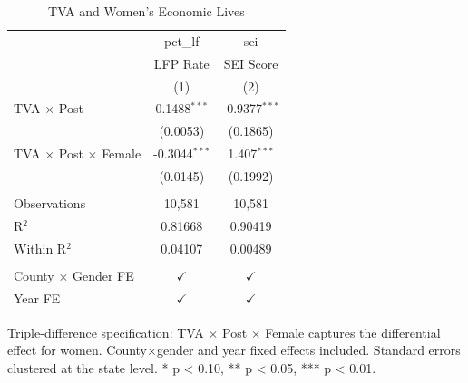 
\begin{table}[htbp]
   \caption{\label{tab:gender} TVA and Women's Economic Lives}
   \bigskip
   \centering
   \begin{tabular}{lcc}
      \toprule
                                    & pct\_lf         & sei\\  
                                    & LFP Rate        & SEI Score \\   
                                    & (1)             & (2)\\  
      \midrule 
      TVA $\times$ Post                    & 0.1488$^{***}$  & -0.9377$^{***}$\\   
                                    & (0.0053)        & (0.1865)\\   
      TVA $\times$ Post $\times$ Female             & -0.3044$^{***}$ & 1.407$^{***}$\\   
                                    & (0.0145)        & (0.1992)\\   
       \\
      Observations                  & 10,581          & 10,581\\  
      R$^2$                         & 0.81668         & 0.90419\\  
      Within R$^2$                  & 0.04107         & 0.00489\\  
       \\
      County $\times$ Gender FE  & $\checkmark$    & $\checkmark$\\   
      Year FE            & $\checkmark$    & $\checkmark$\\   
      \bottomrule
   \end{tabular}
   
   \par \raggedright 
   Triple-difference specification: TVA $\times$ Post $\times$ Female captures the differential effect for women. County$\times$gender and year fixed effects included. Standard errors clustered at the state level. * p < 0.10, ** p < 0.05, *** p < 0.01.
\end{table}


